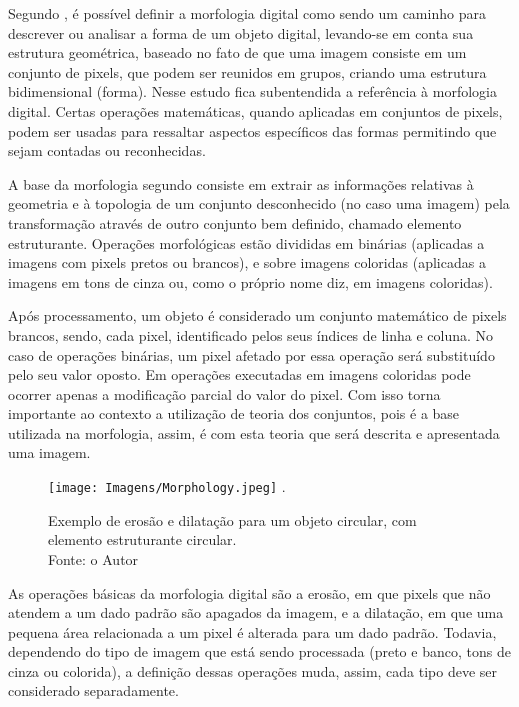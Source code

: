 Segundo , é possível definir a morfologia digital como sendo um caminho para descrever ou analisar a forma de um objeto digital, levando-se em conta sua estrutura geométrica, baseado no fato de que uma imagem consiste em um conjunto de pixels, que podem ser reunidos em grupos, criando uma estrutura bidimensional (forma). Nesse estudo fica subentendida a referência à morfologia digital. Certas operações matemáticas, quando aplicadas em conjuntos de pixels, podem ser usadas para ressaltar aspectos específicos das formas permitindo que sejam contadas ou reconhecidas.

A base da morfologia segundo  consiste em extrair as informações relativas à geometria e à topologia de um conjunto desconhecido (no caso uma imagem) pela transformação através de outro conjunto bem definido, chamado elemento estruturante. Operações morfológicas estão divididas em binárias (aplicadas a imagens com pixels pretos ou brancos), e sobre imagens coloridas (aplicadas a imagens em tons de cinza ou, como o próprio nome diz, em imagens coloridas).

Após processamento, um objeto é considerado um conjunto matemático de pixels brancos, sendo, cada pixel, identificado pelos seus índices de linha e coluna. No caso de operações binárias, um pixel afetado por essa operação será substituído pelo seu valor oposto. Em operações executadas em imagens coloridas pode ocorrer apenas a modificação parcial do valor do pixel.
Com isso torna importante ao contexto a utilização de teoria dos conjuntos, pois é a base utilizada na morfologia, assim, é com esta teoria que será descrita e apresentada uma imagem.  

\begin{figure}[!ht1]
\centering
\texttt{[image: Imagens/Morphology.jpeg]}
\DeclareGraphicsExtensions.
\caption{Exemplo de erosão e dilatação para um objeto circular, com elemento estruturante circular. \\ Fonte: o Autor}
\label{Fig:Morfologia}
\end{figure}

As operações básicas da morfologia digital são a erosão, em que pixels que não atendem a um dado padrão são apagados da imagem, e a dilatação, em que uma pequena área relacionada a um pixel é alterada para um dado padrão. Todavia, dependendo do tipo de imagem que está sendo processada (preto e banco, tons de cinza ou colorida), a definição dessas operações muda, assim, cada tipo deve ser considerado separadamente.



